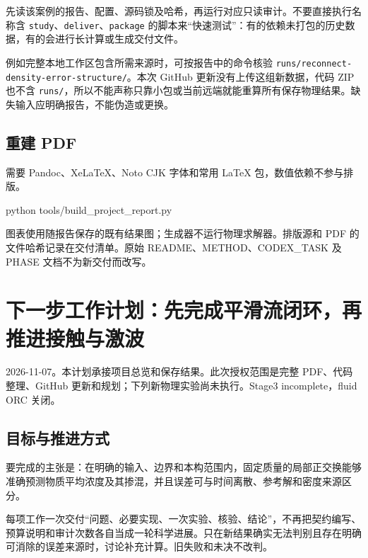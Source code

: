 \documentclass[
  10pt,
  a4paper,
]{article}
\newenvironment{Shaded}{}{}
\newcommand{\ExtensionTok}[1]{#1}
\newcommand{\NormalTok}[1]{#1}
\begin{document}
先读该案例的报告、配置、源码锁及哈希，再运行对应只读审计。不要直接执行名称含
\nolinkurl{study}、\nolinkurl{deliver}、\nolinkurl{package}
的脚本来``快速测试''：有的依赖未打包的历史数据，有的会进行长计算或生成交付文件。

例如完整本地工作区包含所需来源时，可按报告中的命令核验
\nolinkurl{runs/reconnect-density-error-structure/}。本次 GitHub
更新没有上传这组新数据，代码 ZIP 也不含
\nolinkurl{runs/}，所以不能声称只靠小包或当前远端就能重算所有保存物理结果。缺失输入应明确报告，不能伪造或更换。

\subsection{重建 PDF}\label{ux91cdux5efa-pdf}

需要 Pandoc、XeLaTeX、Noto CJK 字体和常用 LaTeX 包，数值依赖不参与排版。

\begin{Shaded}
\begin{Highlighting}[]
\ExtensionTok{python}\NormalTok{ tools/build\_project\_report.py}
\end{Highlighting}
\end{Shaded}

图表使用随报告保存的既有结果图；生成器不运行物理求解器。排版源和 PDF
的文件哈希记录在交付清单。原始 README、METHOD、CODEX\_TASK 及 PHASE
文档不为新交付而改写。

\newpage

\section{下一步工作计划：先完成平滑流闭环，再推进接触与激波}\label{ux4e0bux4e00ux6b65ux5de5ux4f5cux8ba1ux5212ux5148ux5b8cux6210ux5e73ux6ed1ux6d41ux95edux73afux518dux63a8ux8fdbux63a5ux89e6ux4e0eux6fc0ux6ce2}

2026-11-07。本计划承接项目总览和保存结果。此次授权范围是完整
PDF、代码整理、GitHub 更新和规划；下列新物理实验尚未执行。Stage3
incomplete，fluid ORC 关闭。

\subsection{目标与推进方式}\label{ux76eeux6807ux4e0eux63a8ux8fdbux65b9ux5f0f}

要完成的主张是：在明确的输入、边界和本构范围内，固定质量的局部正交换能够准确预测物质平均浓度及其掺混，并且误差可与时间离散、参考解和密度来源区分。

每项工作一次交付``问题、必要实现、一次实验、核验、结论''，不再把契约编写、预算说明和审计次数各自当成一轮科学进展。只在新结果确实无法判别且存在明确可消除的误差来源时，讨论补充计算。旧失败和未决不改判。
\end{document}
